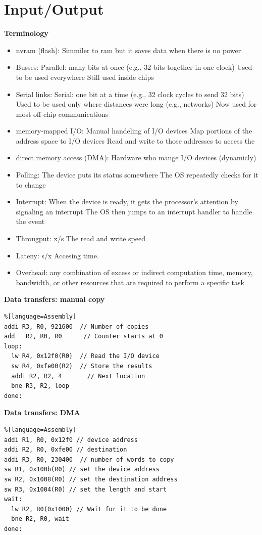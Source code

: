 \documentclass{article}
\begin{document}
\newpage


\section{Input/Output}

\textbf{Terminology}
\begin{itemize}
\item  nvram (flash): Simmiler to ram but it saves data when there is no power
\item  Busses:
  Parallel: many bits at once (e.g., 32 bits together in one clock)
  Used to be used everywhere
  Still used inside chips
\item  Serial links:
  Serial: one bit at a time (e.g., 32 clock cycles to send 32 bits)
  Used to be used only where distances were long (e.g., networks)
  Now used for most off-chip communications
\item  memory-mapped I/O:
  Manual handeling of I/O devices
  Map portions of the address space to I/O devices
  Read and write to those addresses to access the 
\item  direct memory access (DMA):
  Hardware who mange I/O devices (dynamicly)
\item  Polling:
  The device puts its status somewhere
  The OS repeatedly checks for it to change
\item  Interrupt:
  When the device is ready, it gets the processor’s attention by signaling an interrupt
  The OS then jumps to an interrupt handler to handle the event
\item  Througput: x/s
  The read and write speed
\item  Lateny: s/x
  Accesing time.
\item  Overhead:
  any combination of excess or 
  indirect computation time, memory, bandwidth,
  or other resources that are required to perform a specific task
\end{itemize}


\newpage

\textbf{Data transfers: manual copy}
\begin{lstlisting}%[language=Assembly]
addi R3, R0, 921600  // Number of copies
add   R2, R0, R0      // Counter starts at 0
loop:
  lw R4, 0x12f0(R0)  // Read the I/O device
  sw R4, 0xfe00(R2)  // Store the results
  addi R2, R2, 4       // Next location
  bne R3, R2, loop
done:
\end{lstlisting}


\textbf{Data transfers: DMA}
\begin{lstlisting}%[language=Assembly]
addi R1, R0, 0x12f0 // device address
addi R2, R0, 0xfe00 // destination
addi R3, R0, 230400  // number of words to copy
sw R1, 0x100b(R0) // set the device address
sw R2, 0x1008(R0) // set the destination address
sw R3, 0x1004(R0) // set the length and start
wait:
  lw R2, R0(0x1000) // Wait for it to be done
  bne R2, R0, wait
done:
\end{lstlisting}
\end{document}

